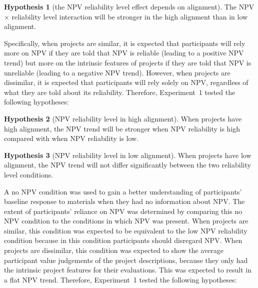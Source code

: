 \documentclass[
  english,
  man, donotrepeattitle,floatsintext]{apa7}
\theoremstyle{definition}
\theoremstyle{definition}
\theoremstyle{definition}
\theoremstyle{definition}
\newtheorem{hypothesis}{Hypothesis}
\theoremstyle{remark}
\begin{document}
\begin{hypothesis}[the NPV reliability level effect depends on alignment]
\protect\hypertarget{hyp:allocation-alignment-reliability-npv-alignment-2}{}{\label{hyp:allocation-alignment-reliability-npv-alignment-2} \iffalse (the NPV reliability level effect depends on alignment) \fi{} }The NPV \(\times\) reliability level interaction will be stronger in the high
alignment than in low alignment.
\end{hypothesis}

Specifically, when projects are similar, it is expected that participants will
rely more on NPV if they are told that NPV is reliable (leading to a positive
NPV trend) but more on the intrinsic features of projects if they are told that
NPV is unreliable (leading to a negative NPV trend). However, when projects are
dissimilar, it is expected that participants will rely solely on NPV, regardless
of what they are told about its reliability. Therefore, Experiment~1 tested the
following hypotheses:

\begin{hypothesis}[NPV reliability level in high alignment]
\protect\hypertarget{hyp:allocation-alignment-high-alignment-2}{}{\label{hyp:allocation-alignment-high-alignment-2} \iffalse (NPV reliability level in high alignment) \fi{} }When projects have high alignment, the NPV trend will be stronger when NPV
reliability is high compared with when NPV reliability is low.
\end{hypothesis}

\begin{hypothesis}[NPV reliability level in low alignment]
\protect\hypertarget{hyp:allocation-alignment-low-alignment-2}{}{\label{hyp:allocation-alignment-low-alignment-2} \iffalse (NPV reliability level in low alignment) \fi{} }When projects have low alignment, the NPV trend will not differ significantly
between the two reliability level conditions.
\end{hypothesis}

A no NPV condition was used to gain a better understanding of participants'
baseline response to materials when they had no information about NPV. The
extent of participants' reliance on NPV was determined by comparing this no NPV
condition to the conditions in which NPV was present. When projects are similar,
this condition was expected to be equivalent to the low NPV reliability
condition because in this condition participants should disregard NPV. When
projects are dissimilar, this condition was expected to show the average
participant value judgements of the project descriptions, because they only had
the intrinsic project features for their evaluations. This was expected to
result in a flat NPV trend. Therefore, Experiment~1 tested the following
hypotheses:
\end{document}
